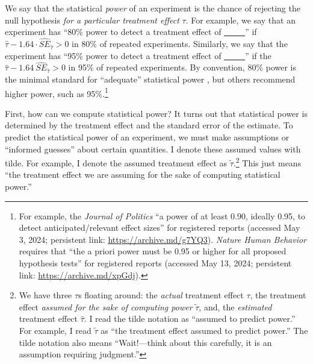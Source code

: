 \documentclass[12pt]{article}
\begin{document}
We say that the statistical \emph{power} of an experiment is the chance of rejecting the null hypothesis \emph{for a particular treatment effect} $\tau$. 
For example, we say that an experiment has ``80\% power to detect a treatment effect of \underline{~~~~~}'' if
$\widehat{\tau} - 1.64 \cdot {\widehat{SE}}_{\widehat{\tau}} > 0$ in 80\% of repeated experiments.
Similarly, we say that the experiment has ``95\% power to detect a treatment effect of \underline{~~~~~}'' if the $\widehat{\tau} - 1.64\ {\widehat{SE}}_{\widehat{\tau}} > 0$ in 95\% of repeated experiments. 
By convention, 80\% power is the minimal standard for ``adequate'' statistical power \citep{Cohen1988}, but others recommend higher power, such as 95\%.\footnote{
  For example, the \textit{Journal of Politics} ``a power of at least 0.90, ideally 0.95, to detect anticipated/relevant effect sizes'' for registered reports (accessed May 3, 2024; persistent link: \url{https://archive.md/g7YQ3}). 
  \textit{Nature Human Behavior} requires that ``the a priori power must be 0.95 or higher for all proposed hypothesis tests'' for registered reports (accessed May 13, 2024; persistent link: \url{https://archive.md/xpGdj}).
  }

First, how can we compute statistical power? 
It turns out that statistical power is determined by the treatment effect and the
standard error of the estimate. 
To predict the statistical power of an experiment, we must make assumptions or ``informed guesses'' about certain quantities. 
I denote these assumed values with tilde. For example, I denote the assumed treatment effect as $\widetilde{\tau}$.\footnote{
  We have three $\tau$s floating around: the \emph{actual} treatment effect $\tau$, the treatment effect \emph{assumed for the sake of computing power} $\widetilde{\tau}$, and, the \emph{estimated} treatment effect $\widehat{\tau}$. 
  I read the tilde notation as ``assumed to predict power.'' 
  For example, I read $\widetilde{\tau}$ as ``the treatment effect assumed
  to predict power.'' 
  The tilde notation also means ``Wait!---think about this carefully, it is an assumption requiring judgment.''}
This just means ``the treatment effect we are assuming for the sake of computing statistical power.''
\end{document}

